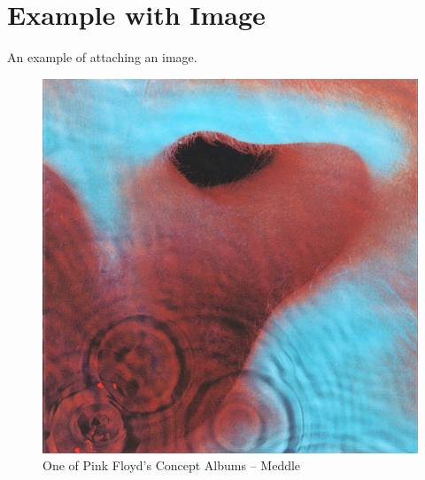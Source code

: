 \documentclass[12pt, letterpaper]{article}
\begin{document}
\section{Example with Image}
An example of attaching an image.
\begin{figure}[H]
\centering
\includegraphics[width=0.6\linewidth]{meddle.jpg}
\caption{One of Pink Floyd's Concept Albums -- Meddle}
\label{meddle}
\end{figure}
\end{document}
